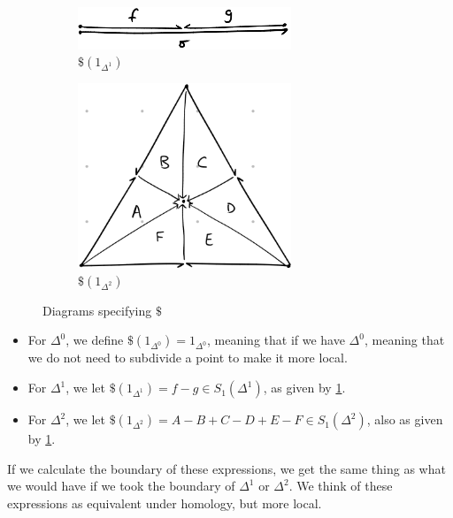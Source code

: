 \documentclass{standalone}
\begin{document}
\begin{figure}
  \centering
  \begin{subfigure}[b]{0.4\textwidth}
    \centering
    \includegraphics[width=0.7\textwidth]{18_905-200923-2.png}
    \caption{\(\$(1_{\Delta^1})\)}
  \end{subfigure}
  \begin{subfigure}[b]{0.4\textwidth}
    \centering
    \includegraphics[width=0.7\textwidth]{18_905-200923-3.png}
    \caption{\(\$(1_{\Delta^2})\)}
  \end{subfigure}
  \caption{Diagrams specifying \(\$\)}%
  \label{fig:locality-2}
\end{figure}
\begin{itemize}[nosep]
  \item For \(\Delta^0\), we define \(\$(1_{\Delta^0}) = 1_{\Delta^0}\),
    meaning that if we have \(\Delta^0\), meaning that we do not need to subdivide a point to make it more local.
  \item For \(\Delta^1\), we let \(\$(1_{\Delta^1}) = f - g \in S_1(\Delta^1)\),
    as given by \cref{fig:locality-2}.
  \item For \(\Delta^2\), we let
    \(\$(1_{\Delta^2}) = A-B+C-D+E-F \in S_1(\Delta^2)\),
    also as given by \cref{fig:locality-2}.
\end{itemize}
If we calculate the boundary of these expressions, we get the same thing as
what we would have if we took the boundary of \(\Delta^1\) or \(\Delta^2\).
We think of these expressions as equivalent under homology, but more local.
\end{document}
